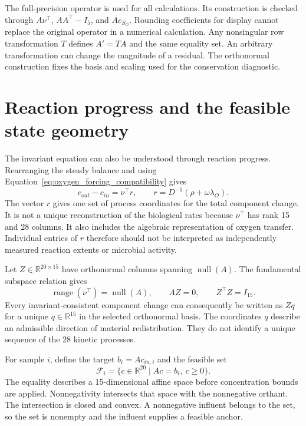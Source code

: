 The full-precision operator is used for all calculations. Its construction is checked through $A\nu^\top$, $AA^\top-I_5$, and $Ae_{S_O}$. Rounding coefficients for display cannot replace the original operator in a numerical calculation. Any nonsingular row transformation $T$ defines $A'=TA$ and the same equality set. An arbitrary transformation can change the magnitude of a residual. The orthonormal construction fixes the basis and scaling used for the conservation diagnostic.

\section{Reaction progress and the feasible state geometry}

The invariant equation can also be understood through reaction progress. Rearranging the steady balance and using Equation~\eqref{eq:oxygen_forcing_compatibility} gives
\begin{equation}
c_{out}-c_{in}=\nu^\top r,\qquad
r=D^{-1}(\rho+\omega\lambda_O).
\label{eq:reaction_progress_coordinates}
\end{equation}
The vector $r$ gives one set of process coordinates for the total component change. It is not a unique reconstruction of the biological rates because $\nu^\top$ has rank 15 and 28 columns. It also includes the algebraic representation of oxygen transfer. Individual entries of $r$ therefore should not be interpreted as independently measured reaction extents or microbial activity.

Let $Z\in\mathbb{R}^{20\times15}$ have orthonormal columns spanning $\operatorname{null}(A)$. The fundamental subspace relation gives
\begin{equation}
\operatorname{range}(\nu^\top)=\operatorname{null}(A),\qquad
AZ=0,\qquad Z^\top Z=I_{15}.
\label{eq:reaction_invariant_subspaces}
\end{equation}
Every invariant-consistent component change can consequently be written as $Zq$ for a unique $q\in\mathbb{R}^{15}$ in the selected orthonormal basis. The coordinates $q$ describe an admissible direction of material redistribution. They do not identify a unique sequence of the 28 kinetic processes.

For sample $i$, define the target $b_i=Ac_{in,i}$ and the feasible set
\begin{equation}
\mathcal{F}_i=\{c\in\mathbb{R}^{20}\mid Ac=b_i,\ c\geq0\}.
\label{eq:reactor_feasible_set}
\end{equation}
The equality describes a 15-dimensional affine space before concentration bounds are applied. Nonnegativity intersects that space with the nonnegative orthant. The intersection is closed and convex. A nonnegative influent belongs to the set, so the set is nonempty and the influent supplies a feasible anchor.

